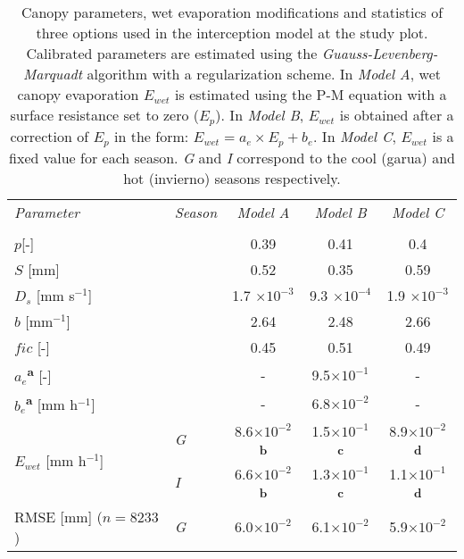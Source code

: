 \documentclass[a4paper,12pt]{article}
\begin{document}
\begin{table}[H]
           \caption{Canopy parameters, wet evaporation modifications and statistics of three options used in the interception model at the study plot. Calibrated parameters are estimated using the \emph{Guauss-Levenberg-Marquadt} algorithm with a regularization scheme. In \textit{Model A}, wet canopy evaporation $E_{wet}$ is estimated using the P-M equation with a surface resistance set to zero ($E_p$). In \textit{Model B}, $E_{wet}$ is obtained after a correction of $E_p$ in the form: $E_{wet}=a_e \times E_p + b_e$. In \textit{Model C}, $E_{wet}$ is a fixed value for each season. \textit{G} and \textit{I} correspond to the cool (garua) and hot (invierno) seasons respectively.} \label{tb:fog_param}
           \centering
           \footnotesize
            \colorbox{gray!15} {
\centering
            \begin{tabular}{llccc}
            \textit{Parameter}&\textit{Season}&\textit{Model A}&\textit{Model B}&\textit{Model C}\\ 
            \hhline{-----} \\[-8pt]
			$p$[-] &&0.39&0.41&0.4\\
			$S$ [mm]&&0.52&0.35&0.59\\
			$D_s$ [mm s$^{-1}$]&&1.7 $\times 10^{-3}$&9.3 $\times 10^{-4}$&1.9 $\times 10^{-3}$\\
			$b$ [mm$^{-1}$]&&2.64&2.48&2.66\\
			$fic$ [-]&&0.45&0.51&0.49\\
			[8pt]
			$a_e$\textsuperscript{\textcolor{Blue4}{\bf {\tiny{a}}}} [-]&&-&9.5$\times 10^{-1}$&-\\
			$b_e$\textsuperscript{\textcolor{Blue4}{\bf {\tiny{a}}}} [mm h$^{-1}$]&&-&6.8$\times 10^{-2}$&-\\
			[8pt]
			\multirow{2}{*}{$E_{wet}$ [mm h$^{-1}$]}&\textit{G}&8.6$\times 10^{-2}$\textsuperscript{\textcolor{Blue4}{\bf {\tiny{b}}}}&1.5$\times 10^{-1}$\textsuperscript{\textcolor{Blue4}{\bf {\tiny{c}}}}&8.9$\times 10^{-2}$\textsuperscript{\textcolor{Blue4}{\bf {\tiny{d}}}} \\			
			&\textit{I}&6.6$\times 10^{-2}$\textsuperscript{\textcolor{Blue4}{\bf {\tiny{b}}}}&1.3$\times 10^{-1}$\textsuperscript{\textcolor{Blue4}{\bf {\tiny{c}}}}&1.1$\times 10^{-1}$\textsuperscript{\textcolor{Blue4}{\bf {\tiny{d}}}} \\			
			[8pt]
			\multirow{2}{*}{RMSE [mm] ($n=8233$)}&\textit{G}&6.0$\times 10^{-2}$&6.1$\times 10^{-2}$&5.9$\times 10^{-2}$\\

\end{tabular}}
\end{table}
\end{document}
